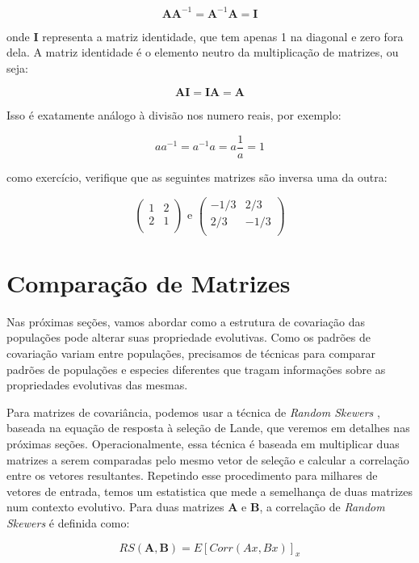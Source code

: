 \documentclass[portuges,]{tufte-handout}
\begin{document}
\[
\mathbf{A}\mathbf{A}^{-1} = \mathbf{A}^{-1}\mathbf{A} = \mathbf{I}
\]

onde $\mathbf{I}$ representa a matriz identidade, que tem apenas 1 na
diagonal e zero fora dela. A matriz identidade é o elemento neutro da
multiplicação de matrizes, ou seja:

\[
\mathbf{A}\mathbf{I} = \mathbf{I}\mathbf{A} = \mathbf{A}
\]

Isso é exatamente análogo à divisão nos numero reais, por exemplo:

\[
aa^{-1} = a^{-1}a = a\frac{1}{a} = 1
\]

como exercício, verifique que as seguintes matrizes são inversa uma da
outra:

\[
\left (
\begin{matrix}
1 & 2 \\
2 & 1 \\
\end{matrix}
\right )
\text{ e }
\left (
\begin{matrix}
-1/3 & 2/3 \\
2/3 & -1/3 \\
\end{matrix}
\right )
\]

\section{Comparação de Matrizes}\label{comparauxe7uxe3o-de-matrizes}

Nas próximas seções, vamos abordar como a estrutura de covariação das
populações pode alterar suas propriedade evolutivas. Como os padrões de
covariação variam entre populações, precisamos de técnicas para comparar
padrões de populações e especies diferentes que tragam informações sobre
as propriedades evolutivas das mesmas.

Para matrizes de covariância, podemos usar a técnica de \emph{Random
Skewers} \cite{Cheverud2007}, baseada na equação de resposta à
seleção de Lande, que veremos em detalhes nas próximas seções.
Operacionalmente, essa técnica é baseada em multiplicar duas matrizes a
serem comparadas pelo mesmo vetor de seleção e calcular a correlação
entre os vetores resultantes. Repetindo esse procedimento para milhares
de vetores de entrada, temos um estatistica que mede a semelhança de
duas matrizes num contexto evolutivo. Para duas matrizes $\mathbf{A}$ e
$\mathbf{B}$, a correlação de \emph{Random Skewers} é definida como:

\[
RS(\mathbf{A}, \mathbf{B}) = E[Corr(Ax, Bx)]_x
\]
\end{document}
